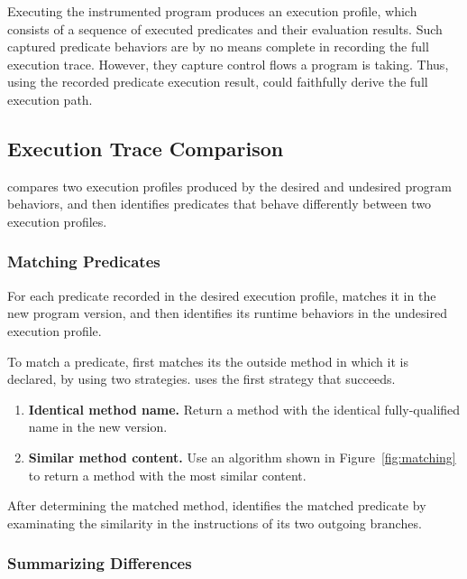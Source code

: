 Executing the instrumented program produces an execution profile,
which consists of a sequence of executed predicates and their
evaluation results. Such captured predicate behaviors are by
no means complete in recording the full execution trace. However,
they capture control flows a program is taking. Thus, using the
recorded predicate execution result, \ourtool could faithfully
derive the full execution path. 

\subsection{Execution Trace Comparison}
\label{sec:comparison}




\ourtool compares two execution profiles
produced by the desired and undesired program behaviors, and
then identifies predicates that behave differently
between two execution profiles. 

\subsubsection{Matching Predicates}

For each predicate recorded in the desired execution profile,
\ourtool matches it in the new program version, and then
identifies its runtime behaviors in the undesired execution profile.

To match a predicate, \ourtool first matches its the outside method
in which it is declared, by using two strategies. \ourtool uses
the first strategy that succeeds.

\begin{enumerate}
\item \textbf{Identical method name.} Return a method with the identical
fully-qualified name in the new version.
\item \textbf{Similar method content.} Use an algorithm shown
in Figure~\ref{fig:matching} to return a method with the most
similar content. 
\end{enumerate}


After determining the matched method, \ourtool identifies
the matched predicate by examinating the similarity in the
instructions of its two outgoing branches.



\subsubsection{Summarizing Differences}

